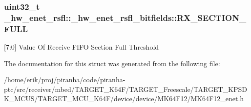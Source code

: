 \subsubsection[{\texorpdfstring{R\+X\+\_\+\+S\+E\+C\+T\+I\+O\+N\+\_\+\+F\+U\+LL}{RX_SECTION_FULL}}]{\setlength{\rightskip}{0pt plus 5cm}uint32\+\_\+t \+\_\+hw\+\_\+enet\+\_\+rsfl\+::\+\_\+hw\+\_\+enet\+\_\+rsfl\+\_\+bitfields\+::\+R\+X\+\_\+\+S\+E\+C\+T\+I\+O\+N\+\_\+\+F\+U\+LL}\hypertarget{struct__hw__enet__rsfl_1_1__hw__enet__rsfl__bitfields_add21f82416f27714dacd1633de7884d2}{}\label{struct__hw__enet__rsfl_1_1__hw__enet__rsfl__bitfields_add21f82416f27714dacd1633de7884d2}
\mbox{[}7\+:0\mbox{]} Value Of Receive F\+I\+FO Section Full Threshold 

The documentation for this struct was generated from the following file\+:\begin{DoxyCompactItemize}
\item 
/home/erik/proj/piranha/code/piranha-\/ptc/src/receiver/mbed/\+T\+A\+R\+G\+E\+T\+\_\+\+K64\+F/\+T\+A\+R\+G\+E\+T\+\_\+\+Freescale/\+T\+A\+R\+G\+E\+T\+\_\+\+K\+P\+S\+D\+K\+\_\+\+M\+C\+U\+S/\+T\+A\+R\+G\+E\+T\+\_\+\+M\+C\+U\+\_\+\+K64\+F/device/device/\+M\+K64\+F12/M\+K64\+F12\+\_\+enet.\+h\end{DoxyCompactItemize}
